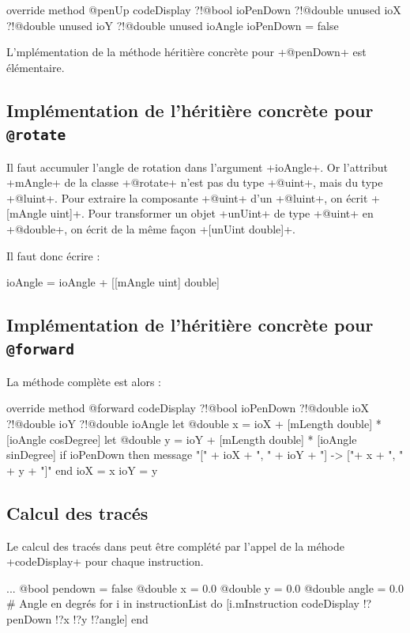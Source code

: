 \begin{galgas}
override method @penUp codeDisplay
  ?!@bool ioPenDown
  ?!@double unused ioX
  ?!@double unused ioY
  ?!@double unused ioAngle
{
  ioPenDown = false
}
\end{galgas}

L'mplémentation de la méthode héritière concrète pour \ggs+@penDown+ est élémentaire.

\subsection{Implémentation de l'héritière concrète pour \texttt{@rotate}}
Il faut accumuler l'angle de rotation dans l'argument \ggs+ioAngle+. Or l'attribut \ggs+mAngle+ de la classe \ggs+@rotate+ n'est pas du type \ggs+@uint+, mais du type \ggs+@luint+. Pour extraire la composante \ggs+@uint+ d’un \ggs+@luint+, on écrit \ggs+[mAngle uint]+. Pour transformer un objet \ggs+unUint+ de type \ggs+@uint+ en \ggs+@double+, on écrit de la même façon \ggs+[unUint double]+. 


 Il faut donc écrire :
\begin{galgas}
ioAngle = ioAngle + [[mAngle uint] double]
\end{galgas}

\subsection{Implémentation de l'héritière concrète pour \texttt{@forward}}
La méthode complète est alors :

\begin{galgas}
override method @forward codeDisplay
  ?!@bool ioPenDown
  ?!@double ioX
  ?!@double ioY
  ?!@double ioAngle
{
  let @double x = ioX + [mLength double] * [ioAngle cosDegree]
  let @double y = ioY + [mLength double] * [ioAngle sinDegree]
  if ioPenDown then
    message "[" + ioX + ", " + ioY + "] -> ["+ x + ", " + y + "]\n"
  end
  ioX = x
  ioY = y
}
\end{galgas}

\subsection{Calcul des tracés}
Le calcul des tracés dans  peut être complété par l'appel de la méhode \ggs+codeDisplay+ pour chaque instruction.
\begin{galgas}
  ...
  @bool pendown = false
  @double x = 0.0
  @double y = 0.0
  @double angle = 0.0 # Angle en degrés
  for i in instructionList do
    [i.mInstruction codeDisplay !?penDown !?x !?y !?angle]
  end
\end{galgas}

